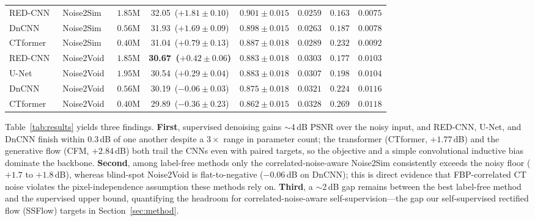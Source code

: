 \documentclass[letterpaper]{article} %
\begin{document}
\begin{table}[t]
\begin{tabular}{llrccccc}
    RED-CNN~\cite{chen2017lowdose}   & Noise2Sim~\cite{niu2020noise2sim} & $1.85\mathrm{M}$ & 32.05 \,($+1.81{\pm}0.10$) & $0.901{\pm}0.015$ & $0.0259$ & $0.163$ & $0.0075$ \\
    DnCNN~\cite{zhang2017beyond}     & Noise2Sim~\cite{niu2020noise2sim} & $0.56\mathrm{M}$ & 31.93 \,($+1.69{\pm}0.09$) & $0.898{\pm}0.015$ & $0.0263$ & $0.187$ & $0.0078$ \\
    CTformer~\cite{wang2022ctformer} & Noise2Sim~\cite{niu2020noise2sim} & $0.40\mathrm{M}$ & 31.04 \,($+0.79{\pm}0.13$) & $0.887{\pm}0.018$ & $0.0289$ & $0.232$ & $0.0092$ \\
    \midrule
    RED-CNN~\cite{chen2017lowdose}   & Noise2Void~\cite{krull2019noise2void} & $1.85\mathrm{M}$ & \textbf{30.67 \,($+0.42{\pm}0.06$)} & $0.883{\pm}0.018$ & $0.0303$ & $0.177$ & $0.0103$ \\
    U-Net                            & Noise2Void~\cite{krull2019noise2void} & $1.95\mathrm{M}$ & 30.54 \,($+0.29{\pm}0.04$) & $0.883{\pm}0.018$ & $0.0307$ & $0.198$ & $0.0104$ \\
    DnCNN~\cite{zhang2017beyond}     & Noise2Void~\cite{krull2019noise2void} & $0.56\mathrm{M}$ & 30.19 \,($-0.06{\pm}0.03$) & $0.875{\pm}0.018$ & $0.0321$ & $0.224$ & $0.0116$ \\
    CTformer~\cite{wang2022ctformer} & Noise2Void~\cite{krull2019noise2void} & $0.40\mathrm{M}$ & 29.89 \,($-0.36{\pm}0.23$) & $0.862{\pm}0.015$ & $0.0328$ & $0.269$ & $0.0118$ \\
    \bottomrule
  \end{tabular}
\end{table}

Table~\ref{tab:results} yields three findings.  \textbf{First}, supervised
denoising gains $\sim$4\,dB PSNR over the noisy input, and RED-CNN, U-Net, and
DnCNN finish within $0.3$\,dB of one another despite a $3\times$ range in
parameter count; the transformer (CTformer, $+1.77$\,dB) and the generative flow
(CFM, $+2.84$\,dB) both trail the CNNs even with paired targets, so the objective
and a simple convolutional inductive bias dominate the backbone.
\textbf{Second}, among label-free methods only the correlated-noise-aware
Noise2Sim consistently exceeds the noisy floor ($+1.7$ to $+1.8$\,dB), whereas
blind-spot Noise2Void is flat-to-negative ($-0.06$\,dB on DnCNN); this is direct
evidence that FBP-correlated CT noise violates the pixel-independence assumption
these methods rely on.  \textbf{Third}, a $\sim$2\,dB gap remains between the best
label-free method and the supervised upper bound, quantifying the headroom
for correlated-noise-aware self-supervision---the gap our self-supervised
rectified flow (SSFlow) targets in Section~\ref{sec:method}.
\end{document}
